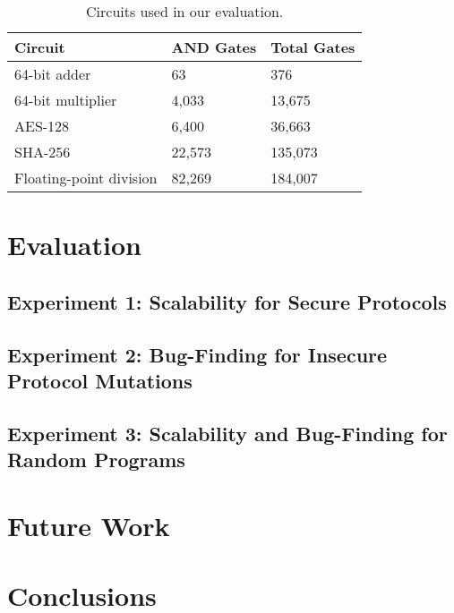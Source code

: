 \documentclass[conference]{IEEEtran}
\begin{document}
\begin{table}
\centering
  \begin{tabular}{|l |l|l|}
    \hline
    \textbf{Circuit} & \textbf{AND Gates} & \textbf{Total Gates} \\
    \hline
    64-bit adder & 63 & 376 \\
    64-bit multiplier & 4,033 & 13,675 \\
    AES-128 & 6,400 & 36,663 \\
    SHA-256 & 22,573 & 135,073 \\
    Floating-point division & 82,269 & 184,007 \\
    \hline
  \end{tabular}
  \caption{Circuits used in our evaluation.}
  \label{tbl:circuits}
\end{table}

\section{Evaluation}

\subsection{Experiment 1: Scalability for Secure Protocols}



\subsection{Experiment 2: Bug-Finding for Insecure Protocol Mutations}

\subsection{Experiment 3: Scalability and Bug-Finding for Random Programs}


\section{Future Work}


\section{Conclusions}
\end{document}
